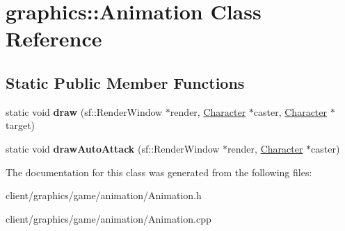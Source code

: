\hypertarget{classgraphics_1_1_animation}{\section{graphics\-:\-:Animation Class Reference}
\label{classgraphics_1_1_animation}
}
\subsection*{Static Public Member Functions}
\begin{DoxyCompactItemize}
\item 
\hypertarget{classgraphics_1_1_animation_a2ab83c47a33652df6b394363a21889ee}{static void {\bfseries draw} (sf\-::\-Render\-Window $\ast$render, \hyperlink{classgraphics_1_1_character}{Character} $\ast$caster, \hyperlink{classgraphics_1_1_character}{Character} $\ast$target)}\label{classgraphics_1_1_animation_a2ab83c47a33652df6b394363a21889ee}

\item 
\hypertarget{classgraphics_1_1_animation_ae1047d6a3d6f1ddf448dfb6be1e0f952}{static void {\bfseries draw\-Auto\-Attack} (sf\-::\-Render\-Window $\ast$render, \hyperlink{classgraphics_1_1_character}{Character} $\ast$caster)}\label{classgraphics_1_1_animation_ae1047d6a3d6f1ddf448dfb6be1e0f952}

\end{DoxyCompactItemize}


The documentation for this class was generated from the following files\-:\begin{DoxyCompactItemize}
\item 
client/graphics/game/animation/Animation.\-h\item 
client/graphics/game/animation/Animation.\-cpp\end{DoxyCompactItemize}
